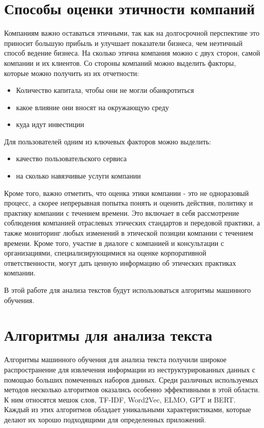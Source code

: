 \documentclass[PI, VKR]{HSEUniversity}
\begin{document}
\section{Способы оценки этичности компаний}
\label{sec:org077b7fe}
Компаниям важно оставаться этичными, так как на долгосрочной перспективе это приносит большую прибыль и улучшает показатели бизнеса, чем неэтичный способ ведение бизнеса\autocites{climent_ethical_2018}[][]{mure_esg_2021}. На сколько этична компания можно с двух сторон, самой компании и их клиентов. Со стороны компаний можно выделить факторы, которые можно получить из их отчетности:
\begin{itemize}
\item Количество капитала, чтобы они не могли обанкротиться
\item какое влияние они вносят на окружающую среду
\item куда идут инвестиции\autocite{harvey1995ethical}
\end{itemize}

Для пользователей одним из ключевых факторов можно выделить:
\begin{itemize}
\item качество пользовательского сервиса\autocite{brunk2010exploring}
\item на сколько навязчивые услуги компании\autocite{mitchell1992bank}
\end{itemize}

Кроме того, важно отметить, что оценка этики компании - это не одноразовый процесс, а скорее непрерывная попытка понять и оценить действия, политику и практику компании с течением времени. Это включает в себя рассмотрение соблюдения компанией отраслевых этических стандартов и передовой практики, а также мониторинг любых изменений в этической позиции компании с течением времени. Кроме того, участие в диалоге с компанией и консультации с организациями, специализирующимися на оценке корпоративной ответственности, могут дать ценную информацию об этических практиках компании.

В этой работе для анализа текстов будут использоваться алгоритмы машинного обучения.
\section{Алгоритмы для анализа текста}
\label{sec:org8eb6e91}
Алгоритмы машинного обучения для анализа текста получили широкое распространение для извлечения информации из неструктурированных данных с помощью больших помеченных наборов данных. Среди различных используемых методов несколько алгоритмов оказались особенно эффективными в этой области. К ним относятся мешок слов\autocite{doi:10.1080/00437956.1954.11659520}, TF-IDF\autocite{jones1972statistical}, Word2Vec\autocite{mikolov2013efficient}, ELMO\autocite{elmo}, GPT\autocite{radford2019language} и BERT\autocite{devlin2018bert}. Каждый из этих алгоритмов обладает уникальными характеристиками, которые делают их хорошо подходящими для определенных приложений.
\end{document}
